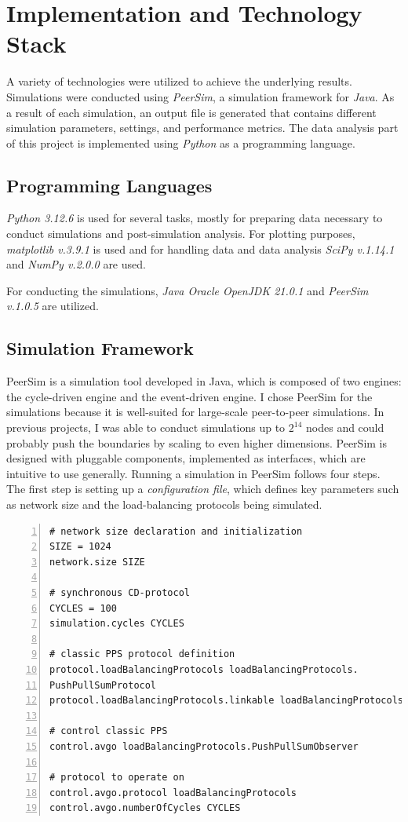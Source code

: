 \chapter{Implementation and Technology Stack}\label{chap:implementation}
A variety of technologies were utilized to achieve the underlying results. Simulations were conducted using \textit{PeerSim}, a simulation framework for \textit{Java}. As a result of each simulation, an output file is generated that contains different simulation parameters, settings, and performance metrics. The data analysis part of this project is implemented using \textit{Python} as a programming language.

\section{Programming Languages}\label{sec:proglangs}
\textit{Python 3.12.6} is used for several tasks, mostly for preparing data necessary to conduct simulations and post-simulation analysis. For plotting purposes, \textit{matplotlib v.3.9.1} is used and for handling data and data analysis \textit{SciPy v.1.14.1} and \textit{NumPy v.2.0.0} are used.

For conducting the simulations, \textit{Java Oracle OpenJDK 21.0.1} and \textit{PeerSim v.1.0.5} are utilized.

\section{Simulation Framework}\label{sec:simulationframework}
PeerSim is a simulation tool developed in Java, which is composed of two engines: the cycle-driven engine and the event-driven engine. I chose PeerSim for the simulations because it is well-suited for large-scale peer-to-peer simulations. In previous projects, I was able to conduct simulations up to $2^{14}$ nodes and could probably push the boundaries by scaling to even higher dimensions. PeerSim is designed with pluggable components, implemented as interfaces, which are intuitive to use generally. Running a simulation in PeerSim follows four steps. The first step is setting up a \textit{configuration file}, which defines key parameters such as network size and the load-balancing protocols being simulated.

\begin{lstlisting}[caption=Example configuration, captionpos=b, numbers=left, label=lst:exampleConfig]
# network size declaration and initialization
SIZE = 1024
network.size SIZE

# synchronous CD-protocol
CYCLES = 100
simulation.cycles CYCLES

# classic PPS protocol definition
protocol.loadBalancingProtocols loadBalancingProtocols.
PushPullSumProtocol
protocol.loadBalancingProtocols.linkable loadBalancingProtocols

# control classic PPS
control.avgo loadBalancingProtocols.PushPullSumObserver

# protocol to operate on
control.avgo.protocol loadBalancingProtocols
control.avgo.numberOfCycles CYCLES
\end{lstlisting}


